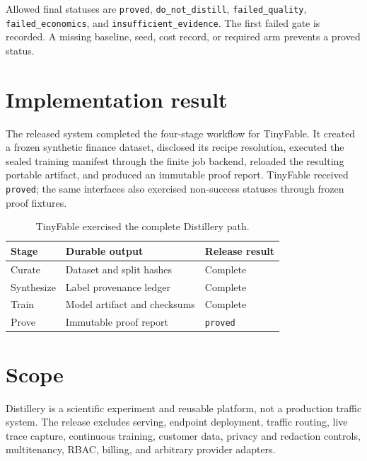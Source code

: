 \documentclass[11pt]{article}
\begin{document}
Allowed final statuses are \texttt{proved}, \texttt{do\_not\_distill}, \texttt{failed\_quality}, \texttt{failed\_economics}, and \texttt{insufficient\_evidence}. The first failed gate is recorded. A missing baseline, seed, cost record, or required arm prevents a proved status.

\section{Implementation result}
The released system completed the four-stage workflow for TinyFable. It created a frozen synthetic finance dataset, disclosed its recipe resolution, executed the sealed training manifest through the finite job backend, reloaded the resulting portable artifact, and produced an immutable proof report. TinyFable received \texttt{proved}; the same interfaces also exercised non-success statuses through frozen proof fixtures.

\begin{table}[h]
\centering
\begin{tabular}{lll}
\toprule
Stage & Durable output & Release result \\
\midrule
Curate & Dataset and split hashes & Complete \\
Synthesize & Label provenance ledger & Complete \\
Train & Model artifact and checksums & Complete \\
Prove & Immutable proof report & \texttt{proved} \\
\bottomrule
\end{tabular}
\caption{TinyFable exercised the complete Distillery path.}
\end{table}

\section{Scope}
Distillery is a scientific experiment and reusable platform, not a production traffic system. The release excludes serving, endpoint deployment, traffic routing, live trace capture, continuous training, customer data, privacy and redaction controls, multitenancy, RBAC, billing, and arbitrary provider adapters.
\end{document}
